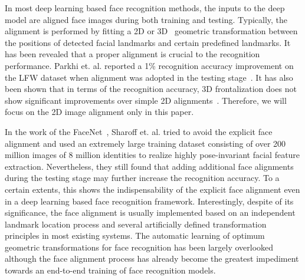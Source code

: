 \documentclass[10pt,twocolumn,letterpaper]{article}
\begin{document}
In most deep learning based face recognition methods, the inputs to the deep model are aligned face images during both training and testing. 
Typically, the alignment is performed by fitting a 2D or 3D~\cite{hu2016face,taigman2014deepface} geometric transformation between the positions of detected facial landmarks and certain predefined landmarks. 
It has been revealed that a proper alignment is crucial to the recognition performance. 
Parkhi et. al. reported a 1\% recognition accuracy improvement on the LFW dataset when alignment was adopted in the testing stage~\cite{parkhi2015deep}. 
It has also been shown that in terms of the recognition accuracy, 3D frontalization does not show significant improvements over simple 2D alignments~\cite{banerjee2016frontalize}. 
Therefore, we will focus on the 2D image alignment only in this paper.

In the work of the FaceNet~\cite{schroff2015facenet}, Sharoff et. al. tried to avoid the explicit face alignment and used an extremely large training dataset consisting of over 200 million images of 8 million identities to realize highly pose-invariant facial feature extraction. 
Nevertheless, they still found that adding additional face alignments during the testing stage may further increase the recognition accuracy. 
To a certain extents, this shows the indispensability of the explicit face alignment even in a deep learning based face recognition framework. 
Interestingly, despite of its significance, the face alignment is usually implemented based on an independent landmark location process and several artificially defined transformation principles in most existing systems. 
The automatic learning of optimum geometric transformations for face recognition has been largely overlooked although the  face alignment process has already become the greatest impediment towards an end-to-end training of face recognition models.
\end{document}
